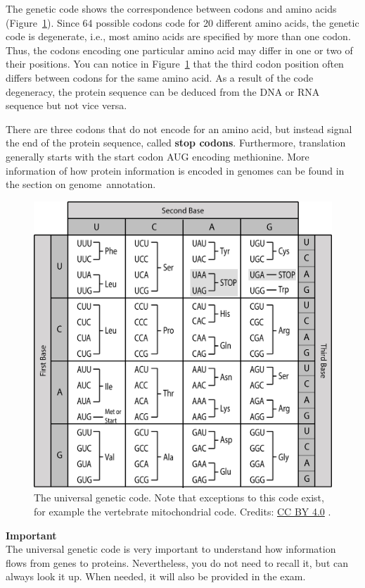 The genetic code shows the correspondence between codons and amino acids (Figure~\ref{geneticcode}).
Since 64 possible codons code for 20 different amino acids, the genetic code is degenerate, i.e., most amino acids are specified by more than one codon.
Thus, the codons encoding one particular amino acid may differ in one or two of their positions.
You can notice in Figure~\ref{geneticcode} that the third codon position often differs between codons for the same amino acid.
As a result of the code degeneracy, the protein sequence can be deduced from the DNA or RNA sequence but not vice versa.

There are three codons that do not encode for an amino acid, but instead signal the end of the protein sequence, called \textbf{stop codons}.
Furthermore, translation generally starts with the start codon AUG encoding methionine.
More information of how protein information is encoded in genomes can be found in the section on genome~annotation.

\begin{figure}[!htbp]
\centering
\includegraphics[width=0.8\linewidth]{files/geneticcode-3167edd785c0ef0c20cd7c489c096264.jpg}
\caption[]{The universal genetic code. Note that exceptions to this code exist, for example the vertebrate mitochondrial code.
Credits: \href{https://creativecommons.org/licenses/by/4.0}{CC BY 4.0} \cite{geneticcode_2018}.}
\label{geneticcode}
\end{figure}

\begin{framed}
\textbf{Important}\\
The universal genetic code is very important to understand how information flows from genes to proteins.
Nevertheless, you do not need to recall it, but can always look it up.
When needed, it will also be provided in the exam.
\end{framed}

